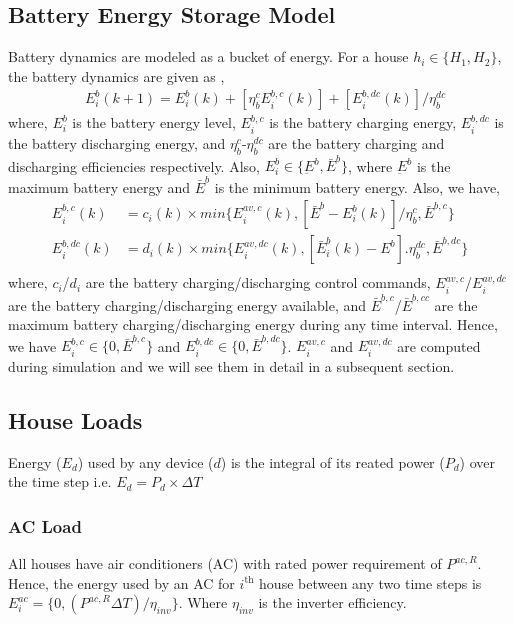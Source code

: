 \documentclass[11pt,usenames]{article}
\begin{document}
\subsection{Battery Energy Storage Model}\label{subsection:BatteryEnergyStorageModel}
Battery dynamics are modeled as a bucket of energy. For a house $h_{i} \in \{H_{1}, H_{2}\}$, the battery dynamics are given as ,
\begin{align}
	&E_{i}^{b}(k+1) = E_{i}^{b}(k)+\left[ \eta_{b}^{c} E_{i}^{b,c}(k)\right] +\left[  E_{i}^{b,dc}(k)\right] / \eta_{b}^{dc}
\end{align}
where, $E_{i}^{b}$ is the battery energy level, $E_{i}^{b,c}$ is the battery charging energy, $E_{i}^{b,dc}$ is the battery discharging energy, and $\eta_{b}^{c}$-$\eta_{b}^{dc}$ are the battery charging and discharging efficiencies respectively. Also, $E_{i}^{b} \in \{\underbar E^{b}, \bar E^{b} \}$, where $\underbar E^{b}$ is the maximum battery energy and $\bar E^{b}$ is the minimum battery energy. Also, we have,
\begin{align}
	E_{i}^{b,c}(k) &= c_{i}(k) \times min\{E_{i}^{av,c}(k), \left[ \bar E^{b}- E_{i}^{b}(k)\right]/\eta_{b}^{c}, \bar E^{b,c} \} \\
	E_{i}^{b,dc}(k) &= d_{i}(k) \times min\{E_{i}^{av,dc}(k), \left[ \bar  E_{i}^{b}(k)-E^{b}\right].\eta_{b}^{dc}, \bar E^{b,dc} \} \\	
\end{align}
where, $c_{i}$/$d_{i}$ are the battery charging/discharging control commands, $E_{i}^{av,c}$/$E_{i}^{av,dc}$ are the battery charging/discharging energy available, and $\bar E^{b,c}$/$\bar E^{b,cc}$ are the maximum battery charging/discharging energy during any time interval. Hence, we have $E_{i}^{b,c} \in \{0, \bar E^{b,c}\}$ and $E_{i}^{b,dc} \in \{0, \bar E^{b,dc}\}$. $E_{i}^{av,c}$ and $E_{i}^{av,dc}$ are computed during simulation and we will see them in detail in a subsequent section.

\subsection{House Loads}\label{subsection:HouseLoads}
Energy ($E_{d}$) used by any device ($d$) is the integral of its reated power ($P_{d}$) over the time step i.e. $E_{d}=P_{d} \times \Delta T$

\subsubsection{AC Load}\label{subsubsection:ACLoad}
All houses have air conditioners (AC) with rated power requirement of $P^{ac,R}$. Hence, the energy used by an AC for $i^{\text{th}}$ house between any two time steps is $E_{i}^{ac}=\{0,(P^{ac,R} \Delta T)/\eta_{inv}\}$. Where $\eta_{inv}$ is the inverter efficiency.
\end{document}
